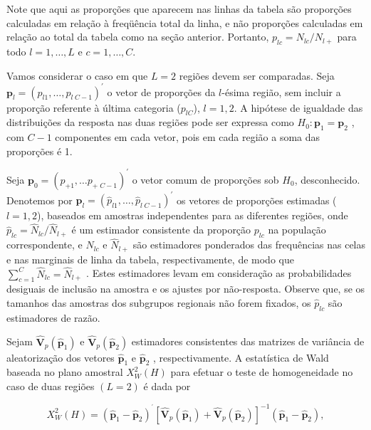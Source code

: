 \documentclass[]{book}
\theoremstyle{definition}
\theoremstyle{definition}
\theoremstyle{definition}
\theoremstyle{remark}
\begin{document}
Note que aqui as proporções que aparecem nas linhas da tabela são
proporções calculadas em relação à freqüência total da linha, e não
proporções calculadas em relação ao total da tabela como na seção
anterior. Portanto, \(p_{lc}=N_{lc}/N_{l+}\) para todo \(l=1,\ldots ,L\)
e \(c=1,\ldots ,C\).

Vamos considerar o caso em que \(L=2\) regiões devem ser comparadas.
Seja
\(\mathbf{p}_{l}=\left( p_{l1},\ldots ,p_{l\;C-1}\right) ^{\prime }\) o
vetor de proporções da \(l\)-ésima região, sem incluir a proporção
referente à última categoria (\(p_{lC}\)), \(l=1,2.\) A hipótese de
igualdade das distribuições da resposta nas duas regiões pode ser
expressa como \(H_{0}:\mathbf{p}_{1}=\mathbf{p}_{2}\) , com \(C-1\)
componentes em cada vetor, pois em cada região a soma das proporções é
1.

Seja
\(\mathbf{p}_{0}=\left( p_{+1},\ldots p_{+\;C-1}\right) ^{\prime }\) o
vetor comum de proporções sob \(H_{0}\), desconhecido. Denotemos por
\(\mathbf{\hat{p}}_{l}=\left( \hat{p}_{l1},\ldots ,\hat{p} _{l\;C-1}\right) ^{\prime }\)
os vetores de proporções estimadas (\(l=1,2\)), baseados em amostras
independentes para as diferentes regiões, onde
\(\hat{p}_{lc}=\widehat{N}_{lc}/\widehat{N}_{l+}\) é um estimador
consistente da proporção \(p_{lc}\) na população correspondente, e
\(\widehat{N}_{lc}\) e \(\widehat{N}_{l+}\) são estimadores ponderados
das frequências nas celas e nas marginais de linha da tabela,
respectivamente, de modo que
\(\sum\nolimits_{c=1}^{C} \widehat{N}_{lc}=\widehat{N}_{l+}\) . Estes
estimadores levam em consideração as probabilidades desiguais de
inclusão na amostra e os ajustes por não-resposta. Observe que, se os
tamanhos das amostras dos subgrupos regionais não forem fixados, os
\(\hat{p}_{lc}\) são estimadores de razão.

Sejam \(\mathbf{\hat{V}}_{p}\left( \widehat{\mathbf{p}}_{1}\right)\) e
\(\mathbf{\hat{V}}_{p}\left( \widehat{\mathbf{p}}_{2}\right)\)
estimadores consistentes das matrizes de variância de aleatorização dos
vetores \(\widehat{\mathbf{p}}_{1}\) e \(\widehat{\mathbf{p}}_{2}\) ,
respectivamente. A estatística de Wald baseada no plano amostral
\(X_{W}^{2}\left( H\right)\) para efetuar o teste de homogeneidade no
caso de duas regiões \(\left( L=2\right)\) é dada por

\begin{equation}
X_{W}^{2}\left( H\right) =\left( \mathbf{\hat{p}}_{1}-\mathbf{\hat{p}}
_{2}\right) ^{^{\prime }}\left[ \mathbf{\hat{V}}_{p}\left( \widehat{\mathbf{p
}}_{1}\right) +\mathbf{\hat{V}}_{p}\left( \widehat{\mathbf{p}}_{2}\right)
\right] ^{-1}\left( \mathbf{\hat{p}}_{1}-\mathbf{\hat{p}}_{2}\right) ,
\label{eq:Tab1}
\end{equation}
\end{document}
